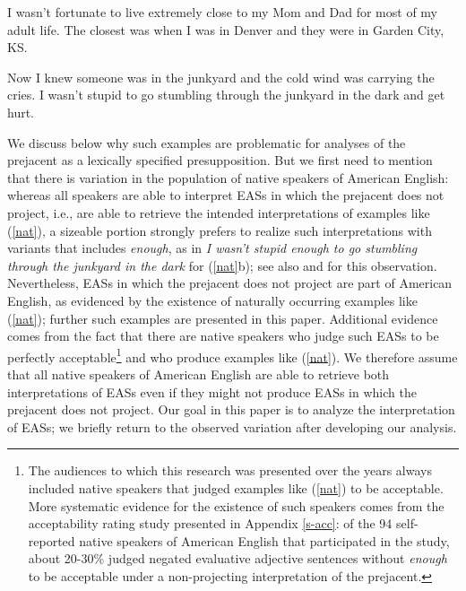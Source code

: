 \documentclass[11pt,fleqn]{article}
\newcommand{\6}{\mbox{$[\hspace*{-.6mm}[$}}
\newcommand{\9}{\mbox{$]\hspace*{-.6mm}]$}}
\begin{document}
\begin{exe}
\ex\label{nat} \citealt[235]{karttunen-etal2014}
\begin{xlist}
\ex I wasn't fortunate to live extremely close to my Mom and Dad for most of my adult life. The closest was when I was in Denver and they were in Garden City, KS.


\ex  Now I knew someone was in the junkyard and the cold wind was
carrying the cries. I wasn't stupid to go stumbling through the
junkyard in the dark and get hurt.

\end{xlist} \end{exe} 

We discuss below why such examples are problematic for analyses of the prejacent as a lexically specified presupposition. But we first need to mention that there is variation in the population of native speakers of American English: whereas all speakers are able to interpret EASs in which the prejacent does not project, i.e., are able to retrieve the intended interpretations of examples like (\ref{nat}), a sizeable portion strongly prefers to realize such interpretations with variants that includes {\em enough}, as in {\em I wasn't stupid enough to go stumbling through the junkyard in the dark} for (\ref{nat}b); see also \citealt{karttunen2013} and \citealt{karttunen-etal2014} for this observation. Nevertheless, EASs in which the prejacent does not project are part of American English, as evidenced by the existence of naturally occurring examples like (\ref{nat}); further  such examples are presented in this paper. Additional evidence comes from the fact that there are native speakers who judge such EASs to be perfectly acceptable\footnote{The audiences to which this research was presented over the years always included native speakers that judged examples like (\ref{nat}) to be acceptable. More systematic evidence for the existence of such speakers comes from the acceptability rating study presented in Appendix \ref{s-acc}: of the 94 self-reported native speakers of American English that participated in the study, about 20-30\% judged negated evaluative adjective sentences without {\em enough} to be acceptable under a non-projecting interpretation of the prejacent.} and who produce examples like (\ref{nat}). We therefore assume that all native speakers of American English are able to retrieve both interpretations of EASs even if they might not produce EASs in which the prejacent does not project. Our goal in this paper is to analyze the interpretation of EASs; we briefly return to the observed variation after developing our analysis.
\end{document}
